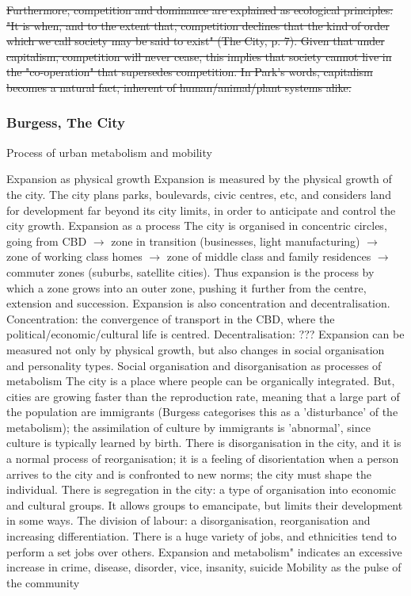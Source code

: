 \documentclass{article}
\begin{document}
\sout{Furthermore, competition and dominance are explained as ecological principles: "It is when, and to the extent that, competition declines that the kind of order which we call society may be said to exist" (The City, p. 7). 
Given that under capitalism, competition will never cease, this implies that society cannot live in the "co-operation" that supersedes competition. 
In Park's words, capitalism becomes a natural fact, inherent of human/animal/plant systems alike.}


\subsubsection{Burgess, The City}

Process of urban metabolism and mobility

\begin{outline}
	\1 Expansion as physical growth
		\2 Expansion is measured by the physical growth of the city. The city plans parks, boulevards, civic centres, etc, and considers land for development far beyond its city limits, in order to anticipate and control the city growth.
	\1 Expansion as a process
		\2 The city is organised in concentric circles, going from CBD $\rightarrow$ zone in transition (businesses, light manufacturing) $\rightarrow$ zone of working class homes $\rightarrow$ zone of middle class and family residences $\rightarrow$ commuter zones (suburbs, satellite cities). Thus expansion is the process by which a zone grows into an outer zone, pushing it further from the centre, extension and succession.
		\2 	Expansion is also concentration and decentralisation. Concentration: the convergence of transport in the CBD, where the political/economic/cultural life is centred. Decentralisation: ???
		\2 	Expansion can be measured not only by physical growth, but also changes in social organisation and personality types. 
	\1 Social organisation and disorganisation as processes of metabolism
		\2 The city is a place where people can be organically integrated. But, cities are growing faster than the reproduction rate, meaning that a large part of the population are immigrants (Burgess categorises this as a 'disturbance' of the metabolism); the assimilation of culture by immigrants is 'abnormal', since culture is typically learned by birth.
		\2 There is disorganisation in the city, and it is a normal process of reorganisation; it is a feeling of disorientation when a person arrives to the city and is confronted to new norms; the city must shape the individual.
		\2 There is segregation in the city: a type of organisation into economic and cultural groups. It allows groups to emancipate, but limits their development in some ways.
		\2 	The division of labour: a disorganisation, reorganisation and increasing differentiation. There is a huge variety of jobs, and ethnicities tend to perform a set jobs over others.
	 	\2 Expansion and metabolism" indicates an excessive increase in crime, disease, disorder, vice, insanity, suicide
	\1 Mobility as the pulse of the community
		\2 
\end{outline}
\end{document}

